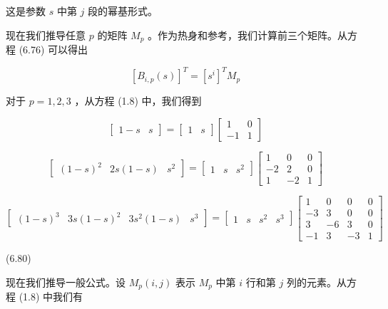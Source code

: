 \documentclass[../main.tex]{subfiles}
\begin{document}
这是参数 \(s\) 中第 \(j\) 段的幂基形式。

现在我们推导任意 \(p\) 的矩阵 \({M}_{p}\) 。作为热身和参考，我们计算前三个矩阵。从方程 (6.76) 可以得出

\[
{\left\lbrack  {B}_{i,p}\left( s\right) \right\rbrack  }^{T} = {\left\lbrack  {s}^{i}\right\rbrack  }^{T}{M}_{p} \tag{6.79}
\]

对于 \(p = 1,2,3\) ，从方程 (1.8) 中，我们得到

\[
\left\lbrack  \begin{array}{ll} 1 - s & s \end{array}\right\rbrack   = \left\lbrack  \begin{array}{ll} 1 & s \end{array}\right\rbrack  \left\lbrack  \begin{matrix} 1 & 0 \\   - 1 & 1 \end{matrix}\right\rbrack
\]

\[
\left\lbrack  \begin{array}{lll} {\left( 1 - s\right) }^{2} & {2s}\left( {1 - s}\right) & {s}^{2} \end{array}\right\rbrack   = \left\lbrack  \begin{array}{lll} 1 & s & {s}^{2} \end{array}\right\rbrack  \left\lbrack  \begin{matrix} 1 & 0 & 0 \\   - 2 & 2 & 0 \\  1 &  - 2 & 1 \end{matrix}\right\rbrack
\]

\[
\left\lbrack  \begin{array}{llll} {\left( 1 - s\right) }^{3} & {3s}{\left( 1 - s\right) }^{2} & 3{s}^{2}\left( {1 - s}\right) & {s}^{3} \end{array}\right\rbrack   = \left\lbrack  \begin{array}{llll} 1 & s & {s}^{2} & {s}^{3} \end{array}\right\rbrack  \left\lbrack  \begin{matrix} 1 & 0 & 0 & 0 \\   - 3 & 3 & 0 & 0 \\  3 &  - 6 & 3 & 0 \\   - 1 & 3 &  - 3 & 1 \end{matrix}\right\rbrack
\]

(6.80)

现在我们推导一般公式。设 \({M}_{p}\left( {i,j}\right)\) 表示 \({M}_{p}\) 中第 \(i\) 行和第 \(j\) 列的元素。从方程 (1.8) 中我们有
\end{document}
